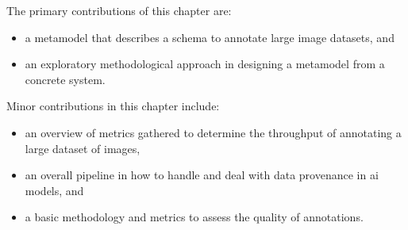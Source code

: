 \bigskip

\noindent
The primary contributions of this chapter are:

\begin{itemize}
  \item a metamodel that describes a schema to annotate large image datasets, and
  \item an exploratory methodological approach in designing a metamodel from a concrete system.
\end{itemize}

\noindent
Minor contributions in this chapter include:

\begin{itemize}
  \item an overview of metrics gathered to determine the throughput of annotating a large dataset of images,
  \item an overall pipeline in how to handle and deal with data provenance in \gls{ai} models, and
  \item a basic methodology and metrics to assess the quality of annotations.
\end{itemize}



